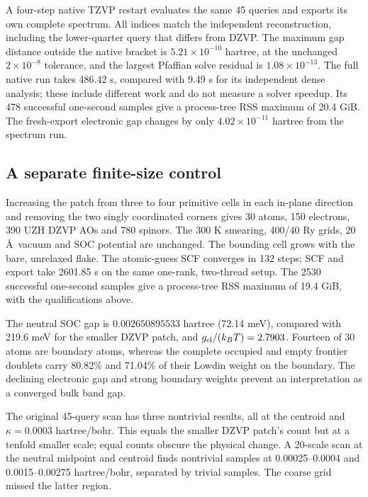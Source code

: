 \documentclass[11pt]{article}
\begin{document}
A four-step native TZVP restart evaluates the same 45 queries
and exports its own complete spectrum. All indices match the
independent reconstruction, including the lower-quarter query
that differs from DZVP. The maximum gap distance outside the
native bracket is $5.21\times10^{-10}$ hartree, at the unchanged
$2\times10^{-8}$ tolerance, and the largest Pfaffian solve
residual is $1.08\times10^{-13}$. The full native run takes
486.42 s, compared with 9.49 s for its independent dense analysis;
these include different work and do not measure a solver speedup.
Its 478 successful one-second samples give a process-tree RSS
maximum of 20.4 GiB. The fresh-export electronic gap changes
by only $4.02\times10^{-11}$ hartree from the spectrum run.

\subsection{A separate finite-size control}
Increasing the patch from three to four primitive cells in each
in-plane direction and removing the two singly coordinated corners
gives 30 atoms, 150 electrons, 390 UZH DZVP AOs and 780 spinors.
The 300 K smearing, 400/40 Ry grids, 20 \AA\ vacuum and SOC
potential are unchanged. The bounding cell grows with the bare,
unrelaxed flake. The atomic-guess SCF converges in 132 steps;
SCF and export take 2601.85 s on the same one-rank, two-thread
setup. The 2530 successful one-second samples give a process-tree
RSS maximum of 19.4 GiB, with the qualifications above.

The neutral SOC gap is $0.002650895533$ hartree (72.14 meV),
compared with 219.6 meV for the smaller DZVP patch, and
$g_{\rm el}/(k_BT)=2.7903$. Fourteen of 30 atoms are boundary
atoms, whereas the complete occupied and empty frontier doublets
carry 80.82\% and 71.04\% of their Lowdin weight on the boundary.
The declining electronic gap and strong boundary weights prevent
an interpretation as a converged bulk band gap.

The original 45-query scan has three nontrivial results, all
at the centroid and $\kappa=0.0003$ hartree/bohr. This equals
the smaller DZVP patch's count but at a tenfold smaller scale;
equal counts obscure the physical change. A 20-scale scan at
the neutral midpoint and centroid finds nontrivial samples at
0.00025--0.0004 and 0.0015--0.00275 hartree/bohr, separated by
trivial samples. The coarse grid missed the latter region.
\end{document}
